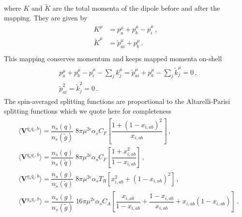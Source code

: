 \documentclass[main.tex]{subfiles}
\begin{document}
        where $K$ and $\widetilde{K}$ are the total momenta
        of the dipole before and after the mapping. They are given by
        \begin{align}\label{eqn:II_mapping2}
            \begin{split}
            K^{\mu} &= p_{a}^{\mu} + p_{b}^{\mu} - p_{i}^{\mu} \, ,\\
            \widetilde{K}^{\mu} &= \tilde{p}_{ai}^{\mu} + p_{b}^{\mu} \, . \\
            \end{split}
        \end{align}
        This mapping conserves momentum and keeps mapped momenta on-shell
        \begin{align}\label{eqn:II_mapping_conditions}
            \begin{split}
            &p_{a}^{\mu} + p_{b}^{\mu} - p_{i}^{\mu} - \sum_{j} k_{j}^{\mu} = \tilde{p}_{ai}^{\mu} + p_{b}^{\mu} - \sum_{j} \tilde{k}_{j}^{\mu} = 0\, , \\
            &\tilde{p}_{ai}^{2} = \tilde{k}_{j}^{2} = 0 \, .
            \end{split}
        \end{align}
        The spin-averaged splitting functions are proportional
        to the Altarelli-Parisi splitting functions which we
        quote here for completeness
        \begin{align}\label{V_aib}
            \begin{split}
            &\langle \boldsymbol{V}^{q_{a}q_{i},b} \rangle = \dfrac{n_{s}(q)}{n_{s}(\tilde{g})} \; 8\pi \mu^{2\epsilon} \alpha_{s} C_{F} \left[\dfrac{1 + (1-x_{i,ab})^{2}}{x_{i,ab}}\right] \, , \\
            &\langle \boldsymbol{V}^{q_{a}g_{i},b} \rangle = \dfrac{n_{s}(q)}{n_{s}(\tilde{q})} \; 8\pi \mu^{2\epsilon} \alpha_{s} C_{F} \left[\dfrac{1 + x_{i,ab}^{2}}{1 - x_{i,ab}}\right] \, , \\
            &\langle \boldsymbol{V}^{g_{a}\bar{q}_{i},b} \rangle = \dfrac{n_{s}(g)}{n_{s}(\tilde{q})} \; 8\pi \mu^{2\epsilon} \alpha_{s} T_{R} \left[x_{i,ab}^{2} + (1-x_{i,ab})^{2}\right] \, , \\
            &\langle \boldsymbol{V}^{g_{a}g_{i},b} \rangle = \dfrac{n_{s}(g)}{n_{s}(\tilde{g})} \; 16\pi \mu^{2\epsilon} \alpha_{s} C_{A} \left[\dfrac{x_{i,ab}}{1-x_{i,ab}} + \dfrac{1-x_{i,ab}}{x_{i,ab}} + x_{i,ab}(1-x_{i,ab})\right] \, .
            \end{split}
        \end{align}
\end{document}

